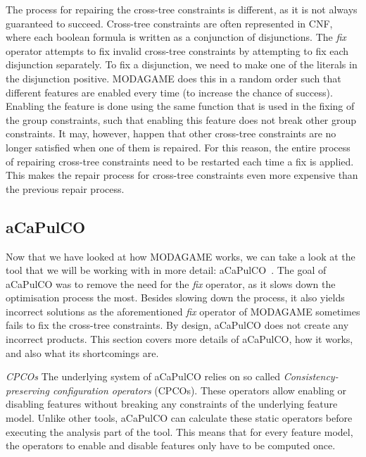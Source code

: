The process for repairing the cross-tree constraints is different, as it is not always
guaranteed to succeed. Cross-tree constraints are often represented in CNF, where
each boolean formula is written as a conjunction of disjunctions. The \emph{fix}
operator attempts to fix invalid cross-tree constraints by attempting to fix each
disjunction separately. To fix a disjunction, we need to make one of the literals
in the disjunction positive. MODAGAME does this in a random order such that different
features are enabled every time (to increase the chance of success). Enabling the
feature is done using the same function that is used in the fixing of the group
constraints, such that enabling this feature does not break other group constraints.
It may, however, happen that other cross-tree constraints are no longer satisfied when
one of them is repaired. For this reason, the entire process of repairing cross-tree
constraints need to be restarted each time a fix is applied. This makes the repair
process for cross-tree constraints even more expensive than the previous repair process.

\subsection{aCaPulCO}\label{sec:acapulco}
Now that we have looked at how MODAGAME works, we can take a look at the tool that
we will be working with in more detail: aCaPulCO~\cite{horcas2022breakit}. The goal
of aCaPulCO was to remove the need for the \emph{fix} operator, as it slows down
the optimisation process the most. Besides slowing down the process, it also yields
incorrect solutions as the aforementioned \emph{fix} operator of MODAGAME sometimes
fails to fix the cross-tree constraints. By design, aCaPulCO does not create any
incorrect products. This section covers more details of aCaPulCO, how it works,
and also what its shortcomings are.

\emph{CPCOs} The underlying system of aCaPulCO relies on so called
\emph{Consistency-preserving configuration operators} (CPCOs). These operators
allow enabling or disabling features without breaking any constraints of the
underlying feature model. Unlike other tools, aCaPulCO can calculate these static
operators before executing the analysis part of the tool. This means that for
every feature model, the operators to enable and disable features only have to be
computed once. 

